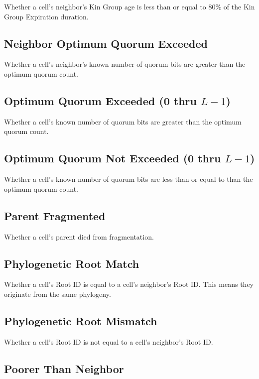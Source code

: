 Whether a cell's neighbor's Kin Group age is less than or equal to 80\% of the Kin Group Expiration duration.

\subsection{Neighbor Optimum Quorum Exceeded}

Whether a cell's neighbor's known number of quorum bits are greater than the optimum quorum count.

\subsection{Optimum Quorum Exceeded (0 thru $L-1$)}

Whether a cell's known number of quorum bits are greater than the optimum quorum count.

\subsection{Optimum Quorum Not Exceeded (0 thru $L-1$)}

Whether a cell's known number of quorum bits are less than or equal to than the optimum quorum count.

\subsection{Parent Fragmented}

Whether a cell's parent died from fragmentation.

\subsection{Phylogenetic Root Match}

Whether a cell's Root ID is equal to a cell's neighbor's Root ID. This means they originate from the same phylogeny.

\subsection{Phylogenetic Root Mismatch}

Whether a cell's Root ID is not equal to a cell's neighbor's Root ID.

\subsection{Poorer Than Neighbor}

